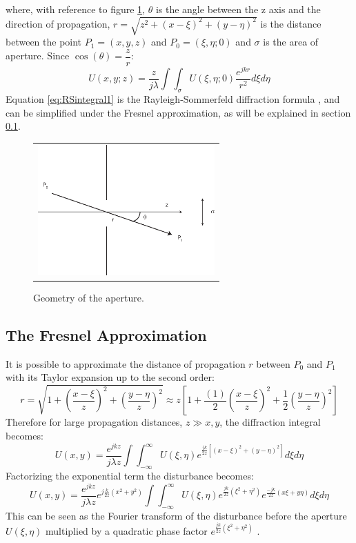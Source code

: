 		where, with reference to figure \ref{fig:RS}, $\theta$ is the angle between the z axis and the direction of propagation, $r=\sqrt{z^2+(x-\xi)^2+(y-\eta)^2}$ is the distance between the point $P_1=(x,y,z)$ and $P_0=(\xi,\eta;0)$ and $\sigma$ is the area of aperture. Since $\cos(\theta)=\dfrac{z}{r}$:
		\begin{equation}
		\label{eq:RSintegral1}
		U(x,y;z)=\dfrac{z}{j\lambda}\int\int_{\sigma}^{}U(\xi,\eta;0)\dfrac{e^{jkr}}{r^2} d\xi d\eta
		\end{equation}
		Equation \ref{eq:RSintegral1} is the Rayleigh-Sommerfeld diffraction formula \cite{goodman2005introduction}, and can be simplified under the Fresnel approximation, as will be explained in section \ref{sec:fresnelapprox}.
		\begin{figure}[H]
			\begin{center}
				\begin{tabular}{c}
					\includegraphics[height=5cm]{RS.eps}
				\end{tabular}
			\end{center}
			\caption{ \label{fig:RS} 
				Geometry of the aperture. }
		\end{figure} 
\subsection{The Fresnel Approximation}
\label{sec:fresnelapprox}
It is possible to approximate the distance of propagation $r$ between $P_0$ and $P_1$ with its Taylor expansion up to the second order:
\begin{equation}
\label{eq:taylor}
r=\sqrt{1+\left(\dfrac{x-\xi}{z}\right)^2+\left(\dfrac{y-\eta}{z}\right)^2}\approx z\left[1+\frac{(1)}{2}\left(\dfrac{x-\xi}{z}\right)^2+\frac{1}{2}\left(\dfrac{y-\eta}{z}\right)^2\right]
\end{equation}
Therefore for large propagation distances, $z\gg x,y$, the diffraction integral becomes:
\begin{equation}
\label{eq:Fresnel}
	U(x,y)=\dfrac{e^{jkz}}{j\lambda z} \int\int_{-\infty}^{\infty}U(\xi,\eta)e^{\frac{jk}{2z}\left[(x-\xi)^2+(y-\eta)^2\right]} d\xi d\eta
\end{equation}
Factorizing the exponential term the disturbance becomes:
\begin{equation}
\label{eq:Fresnel1}
U(x,y)=\dfrac{e^{jkz}}{j\lambda z} e^{j\frac{k}{2z}(x^2+y^2)} \int\int_{-\infty}^{\infty}U(\xi,\eta)e^{\frac{jk}{2z}(\xi^2+\eta^2)}e^{\frac{-jk}{2z}(x\xi+y\eta)} d\xi d\eta
\end{equation}
This can be seen as the Fourier transform of the disturbance before the aperture $U(\xi,\eta)$ multiplied by a quadratic phase factor
 $e^{\frac{jk}{2z}(\xi^2+\eta^2)}$ \cite{goodman2005introduction}.
